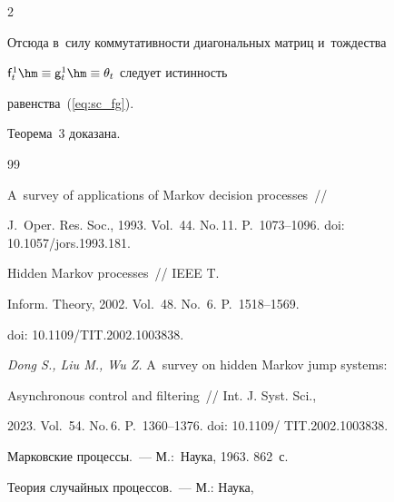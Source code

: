 \begin{multicols}{2}
{   Отсюда в~силу коммутативности диагональных матриц и~тождества 


$\mathsf{f}_{t}^1 \hm\equiv \mathsf{g}_{t}^1\hm\equiv \theta_t$ следует истинность 


равенства~(\ref{eq:sc_fg}).


    Теорема~3 доказана.








}





{\small\frenchspacing


 {\baselineskip=11.5pt




 \begin{thebibliography}{99}






A~survey of applications of Markov decision processes~//


J.~Oper. Res. Soc., 1993. Vol.~44. No.\,11. P.~1073--1096. doi: 10.1057/jors.1993.181.







  Hidden Markov processes~// IEEE T. 


Inform. Theory, 2002. Vol.~48. No.~6. P.~1518--1569.


doi: 10.1109/TIT.2002.1003838.







{\it Dong S., Liu M., Wu Z.} A~survey on hidden Markov jump systems: 


Asynchronous control and filtering~// Int. J. Syst. Sci., 


2023. Vol.~54. No.\,6. P.~1360--1376. doi: 10.1109/ TIT.2002.1003838.







 Марковские процессы.~--- М.:~Наука, 1963. 862~с.







 Теория случайных процессов.~--- М.: Наука, 



\end{thebibliography}}}
\end{multicols}
